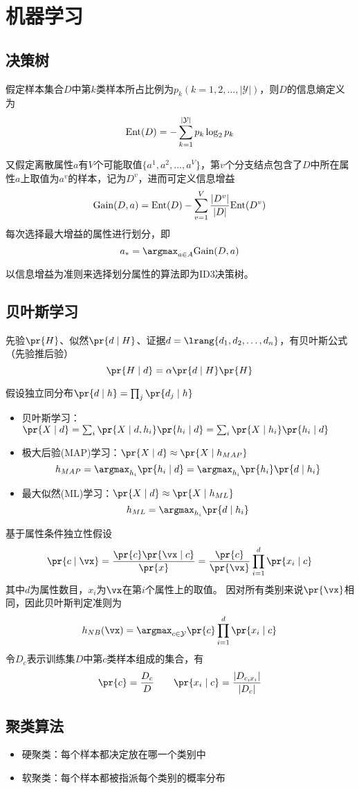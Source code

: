 
\section{机器学习}
\subsection{决策树}
假定样本集合$D$中第$k$类样本所占比例为$p_k(k=1,2,\ldots,|\mathcal{Y}|)$，则$D$的信息熵定义为
\[\mathrm{Ent}(D)=-\sum_{k=1}^{|\mathcal{Y}|}p_k\log_2 p_k\]

又假定离散属性$a$有$V$个可能取值$\{a^1,a^2,\ldots,a^V\}$，第$v$个分支结点包含了$D$中所在属性$a$上取值为$a^v$的样本，记为$D^v$，进而可定义信息增益
\[\mathrm{Gain}(D,a)=\mathrm{Ent}(D)-\sum_{v=1}^V\frac{|D^v|}{|D|}\mathrm{Ent}(D^v)\]
每次选择最大增益的属性进行划分，即
\[a_*=\argmax_{a\in A}\mathrm{Gain}(D,a)\]

以信息增益为准则来选择划分属性的算法即为ID3决策树。

\subsection{贝叶斯学习}
先验$\pr{H}$、似然$\pr{d\mid H}$、证据$d=\lrang{d_1,d_2,\ldots,d_n}$，有贝叶斯公式（先验推后验）
\[\pr{H\mid d}=\alpha\pr{d\mid H}\pr{H}\]

假设独立同分布$\pr{d\mid h}=\prod_j\pr{d_j\mid h}$
\begin{itemize}
	\item 贝叶斯学习：$\pr{X\mid d}=\sum_i\pr{X\mid d,h_i}\pr{h_i\mid d}=\sum_i\pr{X\mid h_i}\pr{h_i\mid d}$
	\item 极大后验(MAP)学习：$\pr{X\mid d}\approx\pr{X\mid h_{MAP}}$
	\[h_{MAP}=\argmax_{h_i}\pr{h_i\mid d}=\argmax_{h_i}\pr{h_i}\pr{d\mid h_i}\]
	\item 最大似然(ML)学习：$\pr{X\mid d}\approx\pr{X\mid h_{ML}}$
	\[h_{ML}=\argmax_{h_i}\pr{d\mid h_i}\]
\end{itemize}

基于属性条件独立性假设
\[\pr{c\mid\vx}=\frac{\pr{c}\pr{\vx\mid c}}{\pr{x}}=\frac{\pr{c}}{\pr{\vx}}\prod_{i=1}^d\pr{x_i\mid c}\]
其中$d$为属性数目，$x_i$为$\vx$在第$i$个属性上的取值。
因对所有类别来说$\pr{\vx}$相同，因此贝叶斯判定准则为
\[h_{NB}(\vx)=\argmax_{c\in\mathcal{Y}}\pr{c}\prod_{i=1}^d\pr{x_i\mid c}\]
令$D_c$表示训练集$D$中第$c$类样本组成的集合，有
\[\pr{c}=\frac{D_c}{D}\qquad\pr{x_i\mid c}=\frac{|D_{c,x_i}|}{|D_c|}\]

\subsection{聚类算法}
\begin{itemize}
	\item 硬聚类：每个样本都决定放在哪一个类别中
	\item 软聚类：每个样本都被指派每个类别的概率分布
\end{itemize}

